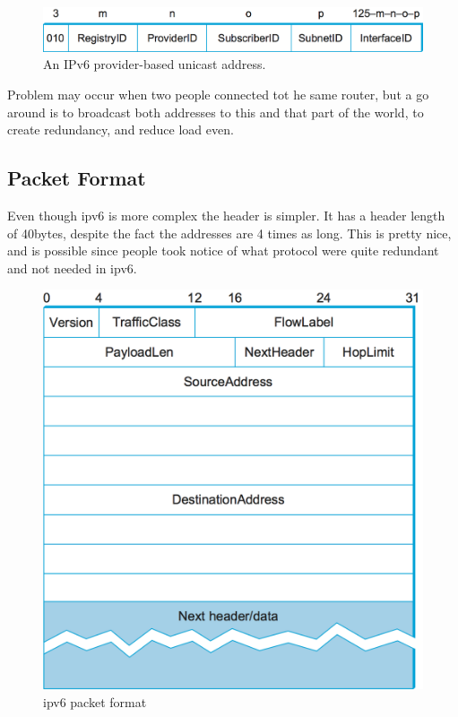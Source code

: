 \documentclass[12pt]{book}
\begin{document}
\begin{figure}[H]
    \centering
    \includegraphics[width = \textwidth]{Pictures/ipv6 format when assigned.png}
    \caption{An IPv6 provider-based unicast address.}
    \label{fig:my_label}
\end{figure}
Problem may occur when two people connected tot he same router, but a go around is to broadcast both addresses to this and that part of the world, to create redundancy, and reduce load even.

\subsection{Packet Format}
Even though ipv6 is more complex the header is simpler. It has a header length of 40bytes, despite the fact the addresses are 4 times as long. This is pretty nice, and is possible since people took notice of what protocol were quite redundant and not needed in ipv6.

\begin{figure}[H]
    \centering
    \includegraphics[width = \textwidth]{Pictures/ipv6 packet fomrat.png}
    \caption{ipv6 packet format}
    \label{fig:my_label}
\end{figure}
\end{document}

